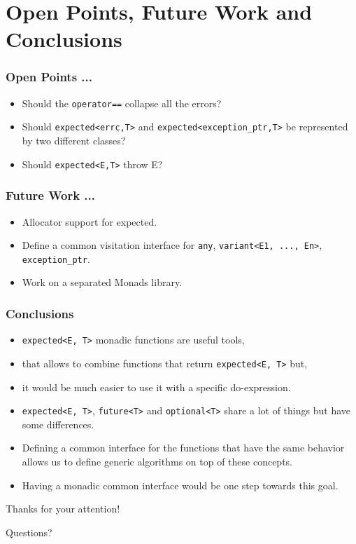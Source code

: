 \documentclass[xcolor=dvipsnames]{beamer}
\newcommand{\cpp}[1]{\lstinline{#1}}
\begin{document}
\section{Open Points, Future Work and Conclusions}

\begin{frame}
\frametitle{Open Points ...}

\begin{itemize}
  \item Should the \cpp{operator==} collapse all the errors?
  \item Should \cpp{expected<errc,T>} and \cpp{expected<exception_ptr,T>} be represented by two different classes?
  \item Should \cpp{expected<E,T>} throw E?
\end{itemize}

\end{frame}

\begin{frame}
\frametitle{Future Work ...}

\begin{itemize}
  \item Allocator support for expected.
  \item Define a common visitation interface for \cpp{any}, \cpp{variant<E1, ..., En>}, \cpp{exception_ptr}.
  \item Work on a separated Monads library.
\end{itemize}

\end{frame}

\begin{frame}
\frametitle{Conclusions}
\begin{itemize}
  \item \cpp{expected<E, T>} monadic functions are useful tools, 
  \item that allows to combine functions that return \cpp{expected<E, T>} but,
  \item it would be much easier to use it with a specific do-expression.
\end{itemize}

\begin{itemize}
  \item \cpp{expected<E, T>}, \cpp{future<T>} and \cpp{optional<T>} share a lot of things but have some differences.
  \item Defining a common interface for the functions that have the same behavior allows us to define generic algorithms on top of these concepts.
  \item Having a monadic common interface would be one step towards this goal.
\end{itemize}

\end{frame}

\begin{frame}
\begin{center}
\Large{Thanks for your attention!}
\end{center}
\begin{center}
\Large{Questions?}
\end{center}
\end{frame}
\end{document}
